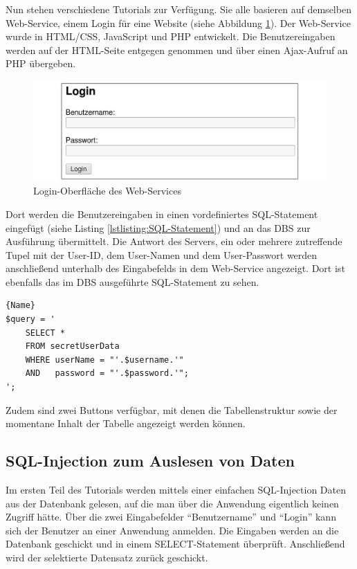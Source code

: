 Nun stehen verschiedene Tutorials zur Verfügung. Sie alle basieren auf demselben Web-Service, einem Login für eine Website (siehe Abbildung \ref{fig:user}). Der Web-Service wurde in HTML/CSS, JavaScript und PHP entwickelt. Die Benutzereingaben werden auf der HTML-Seite entgegen genommen und über einen Ajax-Aufruf an PHP übergeben. 

\begin{figure}[H]
	\centering
	\includegraphics[width=\textwidth]{images/SQL_Injection/login.jpg}
	\caption{Login-Oberfläche des Web-Services}
	\label{fig:user}
\end{figure}

Dort werden die Benutzereingaben in einen vordefiniertes SQL-Statement eingefügt (siehe Listing \ref{lstlisting:SQL-Statement}) und an das DBS zur Ausführung übermittelt. Die Antwort des Servers, ein oder mehrere zutreffende Tupel mit der User-ID, dem User-Namen und dem User-Passwort werden anschließend unterhalb des Eingabefelds in dem Web-Service angezeigt. Dort ist ebenfalls das im DBS ausgeführte SQL-Statement zu sehen.

\begin{lstlisting}[caption=SQL-Statement\label{lstlisting:SQL-Statement}]{Name}
$query = '
	SELECT * 
	FROM secretUserData 
	WHERE userName = "'.$username.'" 
	AND   password = "'.$password.'";
';
\end{lstlisting}

Zudem sind zwei Buttons verfügbar, mit denen die Tabellenstruktur sowie der momentane Inhalt der Tabelle angezeigt werden können.

\subsection{SQL-Injection zum Auslesen von Daten}
Im ersten Teil des Tutorials werden mittels einer einfachen SQL-Injection Daten aus der Datenbank gelesen, auf die man über die Anwendung eigentlich keinen Zugriff hätte. Über die zwei Eingabefelder \enquote{Benutzername} und \enquote{Login} kann sich der Benutzer an einer Anwendung anmelden. Die Eingaben werden an die Datenbank geschickt und in einem SELECT-Statement überprüft. Anschließend wird der selektierte Datensatz zurück geschickt.

